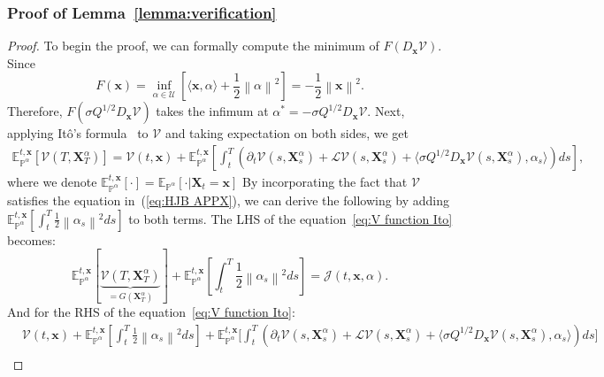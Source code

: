 \documentclass[nohyperref]{article}
\theoremstyle{plain}
\theoremstyle{remark}
\newcommand{\la}{\langle}
\newcommand{\ra}{\rangle}
\newcommand{\mc}{\mathcal}
\newcommand{\mb}{\mathbf}
\newcommand{\norm}[1]{\left\lVert#1\right\rVert}
\begin{document}
\subsubsection{Proof of Lemma~\ref{lemma:verification}}
\begin{proof}
To begin the proof, we can formally compute the minimum of $F(D_{\mb{x}}\mc{V})$. Since~\citep{DaPrato1997}
\begin{equation}
F(\mb{x}) = \inf_{\alpha \in \mc{U}} \left[ \la \mb{x}, \alpha \ra + \frac{1}{2}\norm{\alpha}^2\right] = -\frac{1}{2}\norm{\mb{x}}^2.
\end{equation}
Therefore, $F(\sigma Q^{1/2} D_{\mb{x}}\mc{V})$ takes the infimum at $\alpha^{*} = -\sigma Q^{1/2}D_{\mb{x}}\mc{V}$. Next, applying Itô's formula~\citep[Proposition~1.165]{fabbri2017stochastic} to $\mc{V}$ and taking expectation on both sides, we get
\begin{align}\label{eq:V function Ito} \mathbb{E}_{\mathbb{P}^{\alpha}}^{t, \mb{x}}\left[\mc{V}(T, \mb{X}^{\alpha}_T)\right] = \mc{V}(t, \mb{x}) + \mathbb{E}_{\mathbb{P}^{\alpha}}^{t, \mb{x}}\left[\int_t^T \left(\partial_t \mc{V}(s, \mb{X}^{\alpha}_s) + \mc{L}\mc{V}(s, \mb{X}_s^{\alpha}) + \la \sigma Q^{1/2} D_{\mb{x}}\mc{V}(s, \mb{X}^{\alpha}_s),  \alpha_s \ra \right)ds\right],
\end{align}
where we denote $\mathbb{E}_{\mathbb{P}^{\alpha}}^{t, \mb{x}}\left[\cdot\right] = \mathbb{E}_{\mathbb{P}^{\alpha}}\left[\cdot | \mb{X}_t=\mb{x}\right]$
By incorporating the fact that $\mathcal{V}$ satisfies the equation in~(\ref{eq:HJB APPX}), we can derive the following by adding $\mathbb{E}_{\mathbb{P}^{\alpha}}^{t, \mb{x}}\left[\int_t^T \frac{1}{2}\norm{\alpha_s}^2 ds\right]$ to both terms. The LHS of the equation~\eqref{eq:V function Ito} becomes:
\begin{equation}    \mathbb{E}_{\mathbb{P}^{\alpha}}^{t, \mb{x}}\left[\underbrace{\mc{V}(T, \mb{X}^{\alpha}_T)}_{= G(\mb{X}^{\alpha}_T)}\right]  + \mathbb{E}_{\mathbb{P}^{\alpha}}^{t, \mb{x}}\left[\int_t^T \frac{1}{2}\norm{\alpha_s}^2 ds\right] = \mathcal{J}(t, \mb{x}, \alpha).
\end{equation}
And for the RHS of the equation~\eqref{eq:V function Ito}:
\begin{align}
    &\mc{V}(t, \mb{x}) + \mathbb{E}_{\mathbb{P}^{\alpha}}^{t, \mb{x}}\left[\int_t^T \frac{1}{2}\norm{\alpha_s}^2 ds\right] + \mathbb{E}_{\mathbb{P}^{\alpha}}^{t, \mb{x}}\bigg[\int_t^T \left(\partial_t \mc{V}(s, \mb{X}^{\alpha}_s) + \mathcal{L}\mc{V}(s, \mb{X}_s^{\alpha}) + \la \sigma Q^{1/2} D_{\mb{x}}\mc{V}(s, \mb{X}^{\alpha}_s),  \alpha_s \ra\right) ds \bigg]  \nonumber \\

\end{align}
\end{proof}
\end{document}
